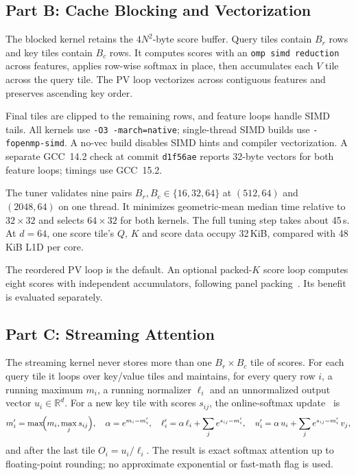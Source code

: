 \documentclass[11pt,a4paper]{article}
\begin{document}
\subsection{Part B: Cache Blocking and Vectorization}
The blocked kernel retains the $4N^2$-byte score buffer. Query tiles contain
$B_r$ rows and key tiles contain $B_c$ rows. It computes scores with an
\texttt{omp simd reduction} across features, applies row-wise softmax in place,
then accumulates each $V$ tile across the query tile. The PV loop vectorizes
across contiguous features and preserves ascending key order.

Final tiles are clipped to the remaining rows, and feature loops handle SIMD
tails. All kernels use \texttt{-O3 -march=native}; single-thread SIMD builds use
\texttt{-fopenmp-simd}. A no-vec build disables SIMD hints and compiler
vectorization. A separate GCC~14.2 check at commit \texttt{d1f56ae} reports
32-byte vectors for both feature loops; timings use GCC~15.2.

The tuner validates nine pairs $B_r,B_c\in\{16,32,64\}$ at $(512,64)$ and
$(2048,64)$ on one thread. It minimizes geometric-mean median time relative
to $32\times32$ and selects $64\times32$ for both kernels. The full tuning step
takes about 45\,s. At $d=64$, one score tile's $Q$, $K$ and score data occupy
32\,KiB, compared with 48\,KiB L1D per core.

The reordered PV loop is the default. An optional packed-$K$ score loop
computes eight scores with independent accumulators, following panel
packing~\cite{goto2008}. Its benefit is evaluated separately.

\subsection{Part C: Streaming Attention}
The streaming kernel never stores more than one $B_r\times B_c$ tile of scores.
For each query tile it loops over key/value tiles and maintains, for every
query row $i$, a running maximum $m_i$, a running normalizer $\ell_i$ and an
unnormalized output vector $u_i\in\mathbb{R}^d$. For a new key tile with scores
$s_{ij}$, the online-softmax update~\cite{milakov2018} is
\[
m_i' = \max\!\Bigl(m_i,\max_j s_{ij}\Bigr),\quad
\alpha = e^{m_i-m_i'},\quad
\ell_i' = \alpha\,\ell_i + \sum_j e^{s_{ij}-m_i'},\quad
u_i' = \alpha\,u_i + \sum_j e^{s_{ij}-m_i'}\,v_j ,
\]
and after the last tile $O_i=u_i/\ell_i$. The result is exact softmax attention
up to floating-point rounding; no approximate exponential or fast-math flag is
used.
\end{document}
